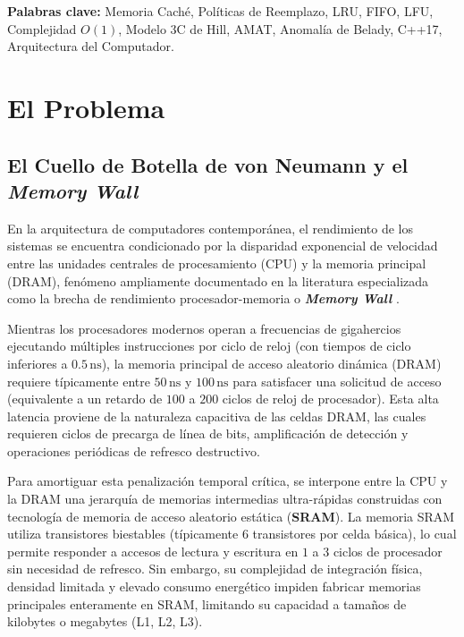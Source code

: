\documentclass[11pt,letterpaper]{article}
\begin{document}
\vspace{0.5cm}
\noindent\textbf{Palabras clave:} Memoria Caché, Políticas de Reemplazo, LRU, FIFO, LFU, Complejidad $O(1)$, Modelo 3C de Hill, AMAT, Anomalía de Belady, C++17, Arquitectura del Computador.

\vspace{1.0cm}
\tableofcontents

\newpage

\section{El Problema}

\subsection{El Cuello de Botella de von Neumann y el \textit{Memory Wall}}
En la arquitectura de computadores contemporánea, el rendimiento de los sistemas se encuentra condicionado por la disparidad exponencial de velocidad entre las unidades centrales de procesamiento (CPU) y la memoria principal (DRAM), fenómeno ampliamente documentado en la literatura especializada como la brecha de rendimiento procesador-memoria o \textbf{\textit{Memory Wall}} \cite{hennessy2011computer}.

Mientras los procesadores modernos operan a frecuencias de gigahercios ejecutando múltiples instrucciones por ciclo de reloj (con tiempos de ciclo inferiores a $0.5\,\text{ns}$), la memoria principal de acceso aleatorio dinámica (DRAM) requiere típicamente entre $50\,\text{ns}$ y $100\,\text{ns}$ para satisfacer una solicitud de acceso (equivalente a un retardo de $100$ a $200$ ciclos de reloj de procesador). Esta alta latencia proviene de la naturaleza capacitiva de las celdas DRAM, las cuales requieren ciclos de precarga de línea de bits, amplificación de detección y operaciones periódicas de refresco destructivo.

Para amortiguar esta penalización temporal crítica, se interpone entre la CPU y la DRAM una jerarquía de memorias intermedias ultra-rápidas construidas con tecnología de memoria de acceso aleatorio estática (\textbf{SRAM}). La memoria SRAM utiliza transistores biestables (típicamente 6 transistores por celda básica), lo cual permite responder a accesos de lectura y escritura en $1$ a $3$ ciclos de procesador sin necesidad de refresco. Sin embargo, su complejidad de integración física, densidad limitada y elevado consumo energético impiden fabricar memorias principales enteramente en SRAM, limitando su capacidad a tamaños de kilobytes o megabytes (L1, L2, L3).
\end{document}
